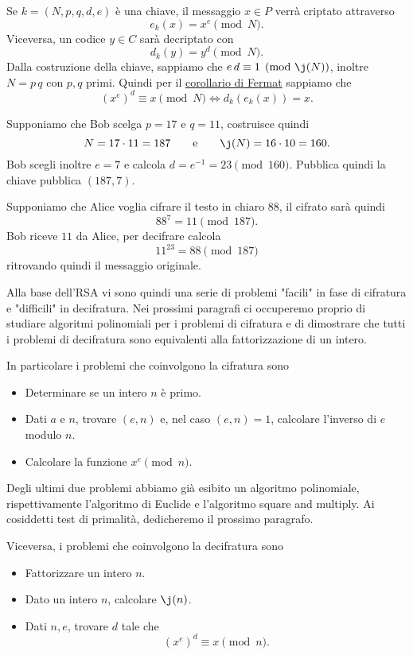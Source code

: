 	Se \(k=(N,p,q,d,e)\) è una chiave, il messaggio \(x\in P\) verrà criptato attraverso
		\[
		e_k(x) = x^e \pmod{N}.
		\]
	Viceversa, un codice \(y\in C\) sarà decriptato con
		\[
		d_k(y) = y^d \pmod{N}.
		\]
	Dalla costruzione della chiave, sappiamo che \(e\,d \equiv 1 \pmod{\j(N)}\), inoltre \(N=p\,q\) con \(p,q\) primi.
	Quindi per il \hyperref[cor:teoremaFermatRSA]{corollario di Fermat} sappiamo che
		\[
		(x^e)^d \equiv x \pmod{N} \iff d_k(e_k(x)) = x.
		\]

	\begin{ese}
	Supponiamo che Bob scelga \(p=17\) e \(q=11\), costruisce quindi
		\[
		N = 17\cdot 11 = 187 \qquad\text{e}\qquad \j(N) = 16\cdot 10 = 160.
		\]
	Bob scegli inoltre \(e=7\) e calcola \(d=e^{-1}=23 \pmod{160}\).
	Pubblica quindi la chiave pubblica \((187,7)\).

	Supponiamo che Alice voglia cifrare il testo in chiaro \(88\), il cifrato sarà quindi
		\[
		88^7 = 11 \pmod{187}.
		\]
	Bob riceve \(11\) da Alice, per decifrare calcola
		\[
		11^{23} = 88 \pmod{187}
		\]
	ritrovando quindi il messaggio originale.
	\end{ese}
	\noindent
	Alla base dell'RSA vi sono quindi una serie di problemi "facili" in fase di cifratura e "difficili" in decifratura.
	Nei prossimi paragrafi ci occuperemo proprio di studiare algoritmi polinomiali per i problemi di cifratura e di dimostrare che tutti i problemi di decifratura sono equivalenti alla fattorizzazione di un intero.

	In particolare i problemi che coinvolgono la cifratura sono
	\begin{itemize}
		\item Determinare se un intero \(n\) è primo.
		\item Dati \(a\) e \(n\), trovare \((e,n)\) e, nel caso \((e,n)=1\), calcolare l'inverso di \(e\) modulo \(n\).
		\item Calcolare la funzione \(x^e \pmod{n}\).
	\end{itemize}
	Degli ultimi due problemi abbiamo già esibito un algoritmo polinomiale, rispettivamente l'algoritmo di Euclide e l'algoritmo square and multiply.
	Ai cosiddetti test di primalità, dedicheremo il prossimo paragrafo.

	Viceversa, i problemi che coinvolgono la decifratura sono
	\begin{itemize}
		\item Fattorizzare un intero \(n\).
		\item Dato un intero \(n\), calcolare \(\j(n)\).
		\item Dati \(n,e\), trovare \(d\) tale che
			\[
			(x^e)^d \equiv x \pmod{n}.
			\]
	\end{itemize}

